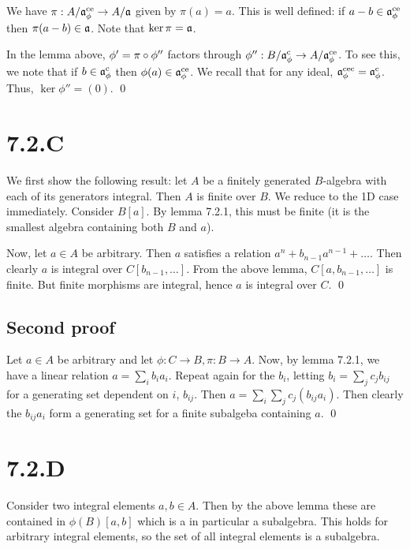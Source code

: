 \documentclass{article}
\begin{document}
\begin{enumerate}[a.]
          We have $\pi: A/\mathfrak{a}^{\text{ce}}_{\phi} \to A/\mathfrak{a}$ given by
          $\pi(a)=a$. This is well defined: if $a-b \in \mathfrak{a}^{\text{ce}}_{\phi}$
          then
          $\pi(a-b) \in \mathfrak{a}$. Note that $\ker \pi = \mathfrak{a}$.

          In the lemma above, $\phi' = \pi \circ \phi''$ factors through
          $\phi'': B/\mathfrak{a}^{\text{c}}_{\phi} \to A/\mathfrak{a}^{\text{ce}}_{\phi}$. To
          see this, we
          note that if $b \in \mathfrak{a}^{\text{c}}_{\phi}$ then $\phi(a) \in
              \mathfrak{a}^{\text{ce}}_{\phi}$. We recall that for any ideal,
          $\mathfrak{a}^{\text{cec}}_{\phi}=\mathfrak{a}^{\text{c}}_{\phi}$. Thus, $\ker \phi'' =
              (0)$.
          \qed

\end{enumerate}

\section{7.2.C}
We first show the following result: let $A$ be a finitely generated $B$-algebra
with each of its generators integral. Then $A$ is finite over $B$. We reduce to
the 1D case immediately. Consider $B[a]$. By lemma 7.2.1, this must be finite
(it is the smallest algebra containing both $B$ and $a$).

Now, let $a \in A$ be arbitrary. Then $a$ satisfies a relation
$a^n+b_{n-1}a^{n-1}+\dots$. Then clearly $a$ is integral over
$C[b_{n-1},\dots]$. From the above lemma, $C[a, b_{n-1},\dots]$ is finite. But
finite morphisms are integral, hence $a$ is integral over $C$. \qed

\subsection*{Second proof}

Let $a \in A$ be arbitrary and let $\phi: C \to B, \pi: B \to A$. Now, by lemma
7.2.1, we have a linear relation $a=\sum_i b_ia_i$. Repeat again for the $b_i$,
letting $b_i=\sum_j c_jb_{ij}$ for a generating set dependent on $i$, $b_{ij}$.
Then $a=\sum_i \sum_j c_j(b_{ij}a_i)$. Then clearly the $b_{ij}a_i$ form a
generating set for a finite subalgeba containing $a$. \qed

\section{7.2.D}
Consider two integral elements $a, b \in A$. Then by the above lemma these are
contained in $\phi(B)[a, b]$ which is a in particular a subalgebra. This holds
for arbitrary integral elements, so the set of all integral elements is a
subalgebra.
\end{document}
